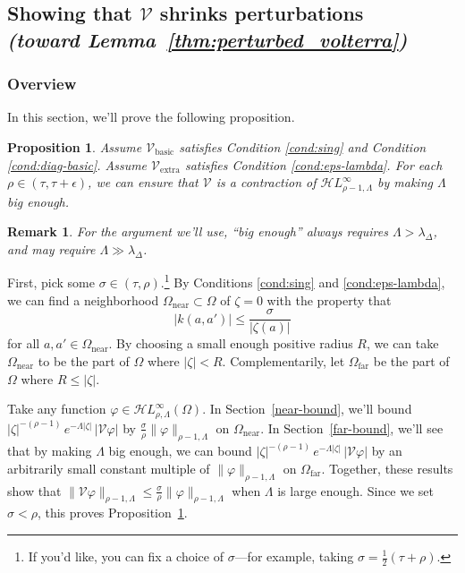 \documentclass{article}
\theoremstyle{plain}
\newtheorem{prop}{Proposition}
\newtheorem{rmk}{Remark}
\newcommand{\singexp}[2]{\mathcal{H}L^\infty_{#1, #2}}
\newcommand{\volterra}{\mathcal{V}}
\newcommand{\hardpart}{\mathcal{V}_\text{basic}}
\newcommand{\softpart}{\mathcal{V}_\text{extra}}
\newcommand{\domain}{\Omega}
\newcommand{\near}{\Omega_\text{near}}
\newcommand{\far}{\Omega_\text{far}}
\begin{document}
\subsection{Showing that $\volterra$ shrinks perturbations \\ \textit{(toward Lemma~\ref{thm:perturbed_volterra})}}\label{sec:V is a contraction}
\subsubsection{Overview}
In this section, we'll prove the following proposition. %

\begin{prop}\label{prop:get-contraction}
Assume $\hardpart$ satisfies {\em Condition \eqref{cond:sing}} and {\em Condition \eqref{cond:diag-basic}}. Assume $\softpart$ satisfies {\em Condition \eqref{cond:eps-lambda}}. For each $\rho \in (\tau, \tau + \epsilon)$, we can ensure that $\volterra$ is a contraction of $\singexp{\rho-1}{\Lambda}$ by making $\Lambda$ big enough.
\end{prop}
\begin{rmk}
For the argument we'll use, ``big enough'' always requires $\Lambda > \lambda_\Delta$, and may require $\Lambda \gg \lambda_\Delta$.
\end{rmk}
First, pick some $\sigma \in (\tau, \rho)$.\footnote{If you'd like, you can fix a choice of $\sigma$---for example, taking $\sigma = \frac{1}{2}(\tau + \rho)$.} By Conditions \eqref{cond:sing} and \eqref{cond:eps-lambda}, we can find a neighborhood $\near \subset \domain$ of $\zeta = 0$ with the property that
\begin{equation}\label{near-limit}
|k(a, a')| \le \frac{\sigma}{|\zeta(a)|}
\end{equation}
for all $a, a' \in \near$. By choosing a small enough positive radius $R$, we can take $\near$ to be the part of $\domain$ where $|\zeta| < R$. Complementarily, let $\far$ be the part of $\domain$ where $R \le |\zeta|$.


Take any function $\varphi \in \singexp{\rho}{\Lambda}(\domain)$. In Section~\ref{near-bound}, we'll bound $|\zeta|^{-(\rho-1)}\,e^{-\Lambda|\zeta|}\,|\volterra\varphi|$ by $\tfrac{\sigma}{\rho} \|\varphi\|_{\rho-1, \Lambda}$ on $\near$. In Section~\ref{far-bound}, we'll see that by making $\Lambda$ big enough, we can bound $|\zeta|^{-(\rho-1)}\,e^{-\Lambda|\zeta|}\,|\volterra\varphi|$ by an arbitrarily small constant multiple of $\|\varphi\|_{\rho-1, \Lambda}$ on $\far$. Together, these results show that $\|\volterra \varphi\|_{\rho-1, \Lambda} \le \tfrac{\sigma}{\rho} \|\varphi\|_{\rho-1, \Lambda}$ when $\Lambda$ is large enough. Since we set $\sigma < \rho$, this proves Proposition~\ref{prop:get-contraction}.
\end{document}

